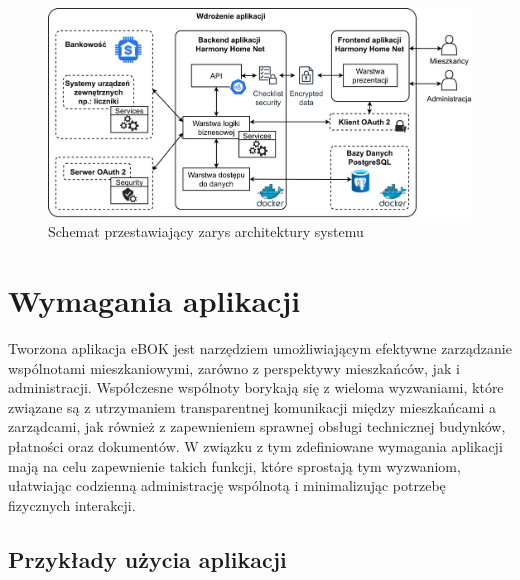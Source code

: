 \begin{figure}[H]
	\centering
		\includegraphics[width=1.1\linewidth]{Schematy/zarys_architektury}
		\caption{Schemat przestawiający zarys architektury systemu}
	\label{fig:zarys_architektury}
\end{figure}



\section{Wymagania aplikacji}



Tworzona aplikacja eBOK jest narzędziem umożliwiającym efektywne zarządzanie wspólnotami mieszkaniowymi, zarówno z perspektywy mieszkańców, jak i administracji. Współczesne wspólnoty borykają się z wieloma wyzwaniami, które związane są z utrzymaniem transparentnej komunikacji między mieszkańcami a zarządcami, jak również z zapewnieniem sprawnej obsługi technicznej budynków, płatności oraz dokumentów. W związku z tym zdefiniowane wymagania aplikacji mają na celu zapewnienie takich funkcji, które sprostają tym wyzwaniom, ułatwiając codzienną administrację wspólnotą i minimalizując potrzebę fizycznych interakcji.

\subsection{Przykłady użycia aplikacji}

